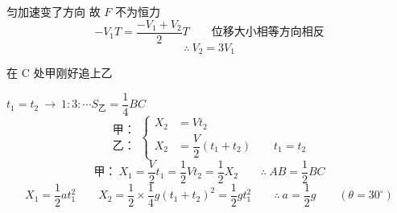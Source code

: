 匀加速\quad {}变了方向 故 $F$ 不为恒力
\[ -V_1T=\dfrac{-V_1+V_2}{2}T\qquad\text{位移大小相等方向相反} \]
\[ \therefore\ V_2=3V_1 \]
\begin{problem}
在 C 处甲刚好追上乙
\begin{solution}
$t_1=t_2\ \to\ 1:3:\cdots$\qquad $S_{\text{乙}}=\dfrac14BC$
\[
\begin{matrix}\text{甲：}\\ \text{乙：}\end{matrix}
\left\{\begin{aligned}
X_2&=Vt_2\\
X_2&=\dfrac{V}{2}(t_1+t_2)\qquad t_1=t_2
\end{aligned}\right.
\]
\[ \text{甲：}\ X_1=\dfrac{V}{2}t_1=\dfrac12Vt_2=\dfrac12X_2\qquad \therefore\ AB=\dfrac12BC \]
\[ X_1=\dfrac12at_1^2\qquad X_2=\dfrac12\times\dfrac14g(t_1+t_2)^2=\dfrac12gt_1^2\qquad \therefore\ a=\dfrac12g\qquad(\theta=30^\circ) \]
\end{solution}
\end{problem}
